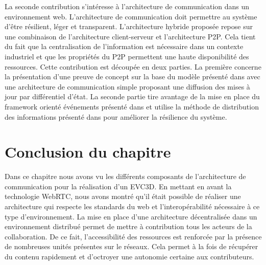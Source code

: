 La seconde contribution s'intéresse à l'architecture de 
communication dans un environnement web. L'architecture de communication doit 
permettre au système d'être résilient, léger et transparent. 
L'architecture hybride proposée repose sur une combinaison de l'architecture 
client-serveur et l'architecture \gls{P2P}. 
Cela tient du fait que la centralisation de l'information est nécessaire dans un 
contexte industriel et que les propriétés du \gls{P2P} permettent une haute disponibilité 
des ressources. Cette contribution est découpée en deux parties. La première 
concerne la présentation d'une preuve de concept sur la base du modèle présenté 
dans \cite{Desprat2015a} avec une architecture de communication simple 
proposant une diffusion des mises à jour par différentiel d'état. La seconde partie 
tire avantage de la mise en place du \gls{framework} orienté événements présenté 
dans 
\cite{Desprat2016} et utilise la méthode de distribution des informations présenté 
dans \cite{Desprat2017} pour améliorer la résilience du système. 








\section{Conclusion du chapitre}
Dans ce chapitre nous avons vu les différents composants de l'architecture de 
communication pour la réalisation d'un \gls{EVC3D}. En mettant en avant la 
technologie WebRTC, nous avons montré qu'il était possible de réaliser une 
architecture qui respecte les standards du web et l'interopérabilité nécessaire à ce 
type d'environnement. La mise en place d'une architecture décentralisée dans un 
environnement distribué permet de mettre à contribution tous les acteurs de la 
collaboration. De ce fait, l'accessibilité des ressources est renforcée par la 
présence de nombreuses unités présentes sur le réseaux. Cela permet à la fois 
de récupérer du contenu rapidement et d'octroyer une autonomie certaine aux 
contributeurs. 
